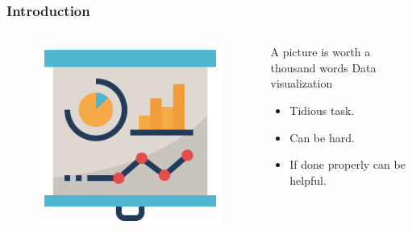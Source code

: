 \begin{frame}
    \frametitle{Introduction}
    \begin{columns}[T]
        \begin{column}{.48\textwidth}
            \begin{figure}[H]
                \includegraphics[width=\textwidth]{images/infographic.png}
                \label{fig:infographic}
            \end{figure}
        \end{column}
        \hfill
        \begin{column}{.48\textwidth}
            \begin{block}{A picture is worth a thousand words}
                Data visualization
            \end{block}
            \begin{itemize}
                \item<2-> Tidious task.
                \item<3-> Can be hard.
                \item<4-> If done properly can be helpful.
            \end{itemize}
        \end{column}
    \end{columns}
\end{frame}


